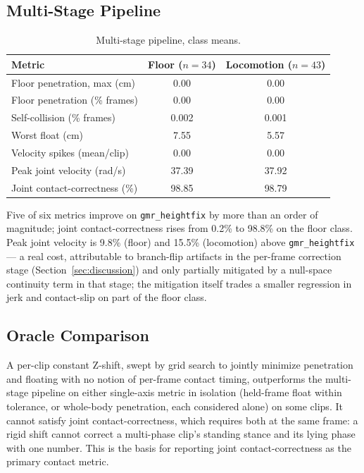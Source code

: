 \subsection{Multi-Stage Pipeline}
\label{sec:results-multistage}

\begin{table}[t]
\centering
\caption{Multi-stage pipeline, class means.}
\label{tab:multistage}
\begin{tabular}{lcc}
\toprule
Metric & Floor ($n=34$) & Locomotion ($n=43$) \\
\midrule
Floor penetration, max (cm)     & 0.00  & 0.00  \\
Floor penetration (\% frames)   & 0.00  & 0.00  \\
Self-collision (\% frames)      & 0.002 & 0.001 \\
Worst float (cm)                & 7.55  & 5.57  \\
Velocity spikes (mean/clip)     & 0.00  & 0.00  \\
Peak joint velocity (rad/s)     & 37.39 & 37.92 \\
Joint contact-correctness (\%)  & 98.85 & 98.79 \\
\bottomrule
\end{tabular}
\end{table}

Five of six metrics improve on \texttt{gmr\_heightfix} by more than an
order of magnitude; joint contact-correctness rises from 0.2\% to 98.8\% on
the floor class. Peak joint velocity is 9.8\% (floor) and 15.5\%
(locomotion) above \texttt{gmr\_heightfix} --- a real cost, attributable to
branch-flip artifacts in the per-frame correction stage
(Section~\ref{sec:discussion}) and only partially mitigated by a null-space
continuity term in that stage; the mitigation itself trades a smaller
regression in jerk and contact-slip on part of the floor class.

\subsection{Oracle Comparison}
\label{sec:results-oracle}

A per-clip constant Z-shift, swept by grid search to jointly minimize
penetration and floating with no notion of per-frame contact timing,
outperforms the multi-stage pipeline on either single-axis metric in
isolation (held-frame float within tolerance, or whole-body penetration,
each considered alone) on some clips. It cannot satisfy joint
contact-correctness, which requires both at the same frame: a rigid shift
cannot correct a multi-phase clip's standing stance and its lying phase
with one number. This is the basis for reporting joint contact-correctness
as the primary contact metric.

